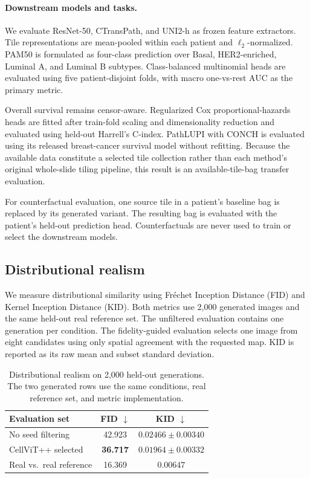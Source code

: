 \paragraph{Downstream models and tasks.}
We evaluate ResNet-50, CTransPath, and UNI2-h as frozen feature extractors. Tile representations are mean-pooled within each patient and $\ell_2$-normalized. PAM50 is formulated as four-class prediction over Basal, HER2-enriched, Luminal A, and Luminal B subtypes. Class-balanced multinomial heads are evaluated using five patient-disjoint folds, with macro one-vs-rest AUC as the primary metric.

Overall survival remains censor-aware. Regularized Cox proportional-hazards heads are fitted after train-fold scaling and dimensionality reduction and evaluated using held-out Harrell's C-index. PathLUPI with CONCH is evaluated using its released breast-cancer survival model without refitting. Because the available data constitute a selected tile collection rather than each method's original whole-slide tiling pipeline, this result is an available-tile-bag transfer evaluation.

For counterfactual evaluation, one source tile in a patient's baseline bag is replaced by its generated variant. The resulting bag is evaluated with the patient's held-out prediction head. Counterfactuals are never used to train or select the downstream models.

\subsection{Distributional realism}
\label{sec:realism-experiment}

We measure distributional similarity using Fr\'echet Inception Distance (FID) and Kernel Inception Distance (KID). Both metrics use 2,000 generated images and the same held-out real reference set. The unfiltered evaluation contains one generation per condition. The fidelity-guided evaluation selects one image from eight candidates using only spatial agreement with the requested map. KID is reported as its raw mean and subset standard deviation.

\begin{table}[t]
\centering
\caption{Distributional realism on 2,000 held-out generations. The two generated rows use the same conditions, real reference set, and metric implementation.}
\label{tab:realism}
\setlength{\tabcolsep}{3.5pt}
\begin{tabular}{lcc}
\toprule
Evaluation set & FID $\downarrow$ & KID $\downarrow$ \\
\midrule
No seed filtering
    & 42.923
    & $0.02466\pm0.00340$ \\
CellViT++ selected
    & \textbf{36.717}
    & $\mathbf{0.01964\pm0.00332}$ \\
Real vs.\ real reference
    & 16.369
    & $0.00647$ \\
\bottomrule
\end{tabular}
\end{table}

